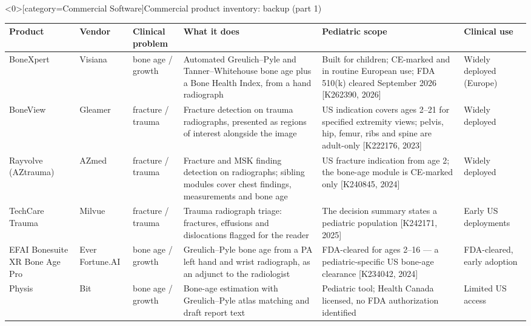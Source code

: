 \documentclass[aspectratio=169]{beamer}
\renewcommand{\arraystretch}{1.08}
\begin{document}
\begin{frame}<0>[category=Commercial Software]{Commercial product inventory: backup (part 1)}
\tiny
\begin{adjustbox}{max totalsize={\textwidth}{0.72\textheight}}
\renewcommand{\arraystretch}{1.2}
\begin{tabular}{|>{\raggedright\arraybackslash}p{}|>{\raggedright\arraybackslash}p{}|>{\raggedright\arraybackslash}p{}|>{\raggedright\arraybackslash}p{}|>{\raggedright\arraybackslash}p{}|>{\raggedright\arraybackslash}p{}|}
\hline \textbf{Product} & \textbf{Vendor} & \textbf{Clinical problem} & \textbf{What it does} & \textbf{Pediatric scope} & \textbf{Clinical use} \\ \hline
BoneXpert & Visiana & bone age / growth & Automated Greulich--Pyle and Tanner--Whitehouse bone age plus a Bone Health Index, from a hand radiograph & Built for children; CE-marked and in routine European use; FDA 510(k) cleared September 2026 [K262390, 2026] & Widely deployed (Europe) \\ \hline
BoneView & Gleamer & fracture / trauma & Fracture detection on trauma radiographs, presented as regions of interest alongside the image & US indication covers ages 2--21 for specified extremity views; pelvis, hip, femur, ribs and spine are adult-only [K222176, 2023] & Widely deployed \\ \hline
Rayvolve (AZtrauma) & AZmed & fracture / trauma & Fracture and MSK finding detection on radiographs; sibling modules cover chest findings, measurements and bone age & US fracture indication from age 2; the bone-age module is CE-marked only [K240845, 2024] & Widely deployed \\ \hline
TechCare Trauma & Milvue & fracture / trauma & Trauma radiograph triage: fractures, effusions and dislocations flagged for the reader & The decision summary states a pediatric population [K242171, 2025] & Early US deployments \\ \hline
EFAI Bonesuite XR Bone Age Pro & Ever Fortune.AI & bone age / growth & Greulich--Pyle bone age from a PA left hand and wrist radiograph, as an adjunct to the radiologist & FDA-cleared for ages 2--16 --- a pediatric-specific US bone-age clearance [K234042, 2024] & FDA-cleared, early adoption \\ \hline
Physis & 16 Bit & bone age / growth & Bone-age estimation with Greulich--Pyle atlas matching and draft report text & Pediatric tool; Health Canada licensed, no FDA authorization identified & Limited US access \\ \hline

\end{tabular}
\end{adjustbox}
\end{frame}
\end{document}
